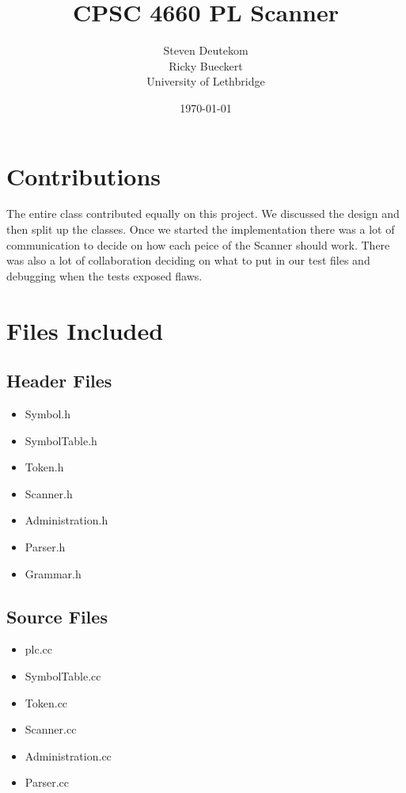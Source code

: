 \documentclass{article}
\begin{document}
\title{CPSC 4660 PL Scanner}
\author{Steven Deutekom\\
	Ricky Bueckert\\
	University of Lethbridge}
\date{\today}

\maketitle

\section{Contributions}
The entire class contributed equally on this project. We discussed the design and then split up the classes. Once we started the implementation there was a lot of communication to decide on how each peice of the Scanner should work. There was also a lot of collaboration deciding on what to put in our test files and debugging when the tests exposed flaws.

\section{Files Included}

\subsection{Header Files}
\begin{itemize}
	\item Symbol.h
	\item SymbolTable.h
	\item Token.h
	\item Scanner.h
	\item Administration.h
  \item Parser.h
  \item Grammar.h
\end{itemize}

\subsection{Source Files}
\begin{itemize}
	\item plc.cc
	\item SymbolTable.cc
	\item Token.cc
	\item Scanner.cc
	\item Administration.cc
  \item Parser.cc
\end{itemize}
\end{document}
